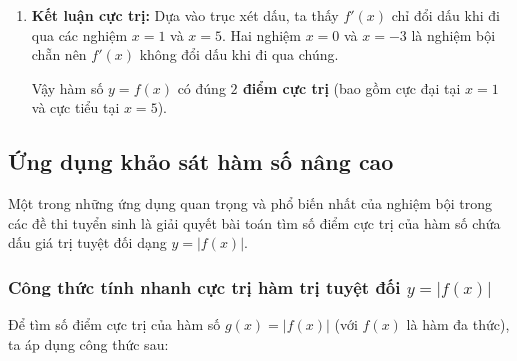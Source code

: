\documentclass[12pt]{article}
\begin{document}
\begin{loigiai}
\begin{enumerate}[label=\textbf{Bước \arabic*:}, leftmargin=*]
\begin{center}
			\end{center}
			\vspace{1mm}
			
			\item \textbf{Kết luận cực trị:}
			Dựa vào trục xét dấu, ta thấy $f'(x)$ chỉ đổi dấu khi đi qua các nghiệm $x = 1$ và $x = 5$. Hai nghiệm $x = 0$ và $x = -3$ là nghiệm bội chẵn nên $f'(x)$ không đổi dấu khi đi qua chúng.
			
			Vậy hàm số $y = f(x)$ có đúng \textbf{$2$ điểm cực trị} (bao gồm cực đại tại $x = 1$ và cực tiểu tại $x = 5$).
		\end{enumerate}
	\end{loigiai}
	
	
	\subsection{Ứng dụng khảo sát hàm số nâng cao}
	
	Một trong những ứng dụng quan trọng và phổ biến nhất của nghiệm bội trong các đề thi tuyển sinh là giải quyết bài toán tìm số điểm cực trị của hàm số chứa dấu giá trị tuyệt đối dạng $y = |f(x)|$.
	
	\subsubsection{Công thức tính nhanh cực trị hàm trị tuyệt đối $y = |f(x)|$}
	Để tìm số điểm cực trị của hàm số $g(x) = |f(x)|$ (với $f(x)$ là hàm đa thức), ta áp dụng công thức sau:
	
\end{document}

